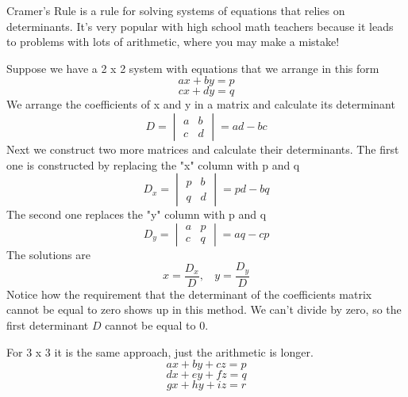 \documentclass[11pt, oneside]{article}
\begin{document}
Cramer's Rule is a rule for solving systems of equations that relies on determinants.  It's very popular with high school math teachers because it leads to problems with lots of arithmetic, where you may make a mistake!

Suppose we have a 2 x 2 system with equations that we arrange in this form
\[ ax + by = p \]
\[ cx + dy = q \]
We arrange the coefficients of x and y in a matrix and calculate its determinant
\[ D = 
\begin{vmatrix} 
  a  &  b \\ 
  c  &  d 
\end{vmatrix} = ad - bc 
\]
Next we construct two more matrices and calculate their determinants.  The first one is constructed by replacing the "x" column with p and q
\[ D_x = 
\begin{vmatrix} 
  p  &  b \\ 
  q  &  d 
\end{vmatrix} = pd - bq 
\]
The second one replaces the "y" column with p and q
\[ D_y = 
\begin{vmatrix} 
  a  &  p \\ 
  c  &  q 
\end{vmatrix} = aq - cp 
\]
The solutions are 
\[ x = \frac{D_x}{D}, \ \ \ \ 
y = \frac{D_y}{D} \]
Notice how the requirement that the determinant of the coefficients matrix cannot be equal to zero shows up in this method.  We can't divide by zero, so the first determinant $D$ cannot be equal to 0.

For 3 x 3 it is the same approach, just the arithmetic is longer.
\[ ax + by + cz = p \]
\[ dx + ey + fz = q \]
\[ gx + hy + iz = r \]
\end{document}
